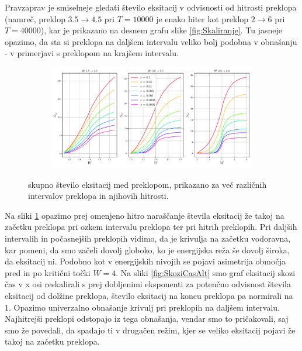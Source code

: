 Pravzaprav je smiselneje gledati število eksitacij v odvisnosti od hitrosti preklopa (namreč, preklop $3.5 \rightarrow 4.5$ pri $T=10000$ je enako hiter kot preklop $2 \rightarrow 6$ pri $T=40000$), kar je prikazano na desnem grafu slike \ref{fig:Skaliranje}. Tu jasneje opazimo, da sta si preklopa na daljšem intervalu veliko bolj podobna v obnašanju - v primerjavi s preklopom na krajšem intervalu. 
\begin{figure}[H]
\centering
\begin{subfigure}{.99\textwidth}
\includegraphics[width=\linewidth]{Figures/SkoziCas.pdf}
\end{subfigure}
\caption{skupno število eksitacij med preklopom, prikazano za več različnih intervalov preklopa in njihovih hitrosti.}
\label{fig:SkoziCas}
\end{figure}
Na sliki \ref{fig:SkoziCas} opazimo prej omenjeno hitro naraščanje števila eksitacij že takoj na začetku preklopa pri ozkem intervalu preklopa ter pri hitrih preklopih.
Pri daljših intervalih in počasnejših preklopih vidimo, da je krivulja na začetku vodoravna, kar pomeni, da smo začeli dovolj globoko, ko je energijska reža še dovolj široka, da eksitacij ni. Podobno kot v energijskih nivojih se pojavi asimetrija območja pred in po kritični točki $W=4$.
Na sliki \ref{fig:SkoziCasAlt} smo graf eksitacij skozi čas v x osi reskalirali s prej dobljenimi eksponenti za potenčno odvisnost števila eksitacij od dolžine preklopa, število eksitacij na koncu preklopa pa normirali na $1$. Opazimo univerzalno obnašanje krivulj pri preklopih na daljšem intervalu. Najhitrejši preklopi odstopajo iz tega obnašanja, vendar smo to pričakovali, saj smo že povedali, da spadajo ti v drugačen režim, kjer se veliko eksitacij pojavi že takoj na začetku preklopa.
